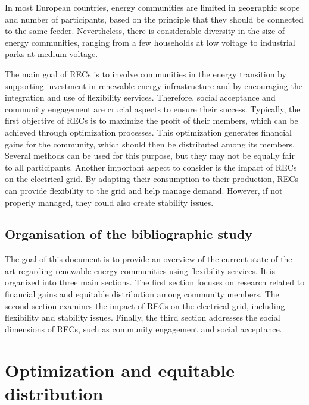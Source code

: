 \documentclass[12pt,a4paper]{article}
\begin{document}
In most European countries, energy communities are limited in geographic scope and number of participants, based on the principle that they should be connected to the same feeder. Nevertheless, there is considerable diversity in the size of energy communities, ranging from a few households at low voltage to industrial parks at medium voltage.

The main goal of RECs is to involve communities in the energy transition by supporting investment in renewable energy infrastructure and by encouraging the integration and use of flexibility services. Therefore, social acceptance and community engagement are crucial aspects to ensure their success. Typically, the first objective of RECs is to maximize the profit of their members, which can be achieved through optimization processes. This optimization generates financial gains for the community, which should then be distributed among its members. Several methods can be used for this purpose, but they may not be equally fair to all participants. Another important aspect to consider is the impact of RECs on the electrical grid. By adapting their consumption to their production, RECs can provide flexibility to the grid and help manage demand. However, if not properly managed, they could also create stability issues.

\subsection{Organisation of the bibliographic study}


The goal of this document is to provide an overview of the current state of the art regarding renewable energy communities using flexibility services. It is organized into three main sections. The first section focuses on research related to financial gains and equitable distribution among community members. The second section examines the impact of RECs on the electrical grid, including flexibility and stability issues. Finally, the third section addresses the social dimensions of RECs, such as community engagement and social acceptance.

\section{Optimization and equitable distribution}
\end{document}
